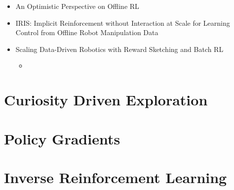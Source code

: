 \documentclass[../main.tex]{subfiles}
\begin{document}
\begin{itemize}
  \item An Optimistic Perspective on Offline RL
  \item IRIS: Implicit Reinforcement without Interaction at Scale for Learning Control from Offline Robot Manipulation Data
  \item Scaling Data-Driven Robotics with Reward Sketching and Batch RL
  \begin{itemize}
    \item
  \end{itemize}

\end{itemize}

\section{Curiosity Driven Exploration}

\section{Policy Gradients}

\section{Inverse Reinforcement Learning}
\end{document}
